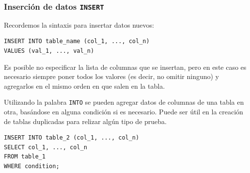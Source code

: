 \subsubsection{Inserción de datos \texttt{INSERT}}

Recordemos la sintaxis para insertar datos nuevos:
\begin{verbatim}
INSERT INTO table_name (col_1, ..., col_n)
VALUES (val_1, ..., val_n)
\end{verbatim}

Es posible no especificar la lista de columnas que se insertan, pero en este caso es necesario siempre poner todos los valores (es decir, no omitir ninguno) y agregarlos en el mismo orden en que salen en la tabla.

Utilizando la palabra \texttt{INTO} se pueden agregar datos de columnas de una tabla en otra, basándose en alguna condición si es necesario. Puede ser útil en la creación de tablas duplicadas para relizar algún tipo de prueba.

\begin{verbatim}
INSERT INTO table_2 (col_1, ..., col_n)
SELECT col_1, ..., col_n
FROM table_1
WHERE condition;
\end{verbatim}